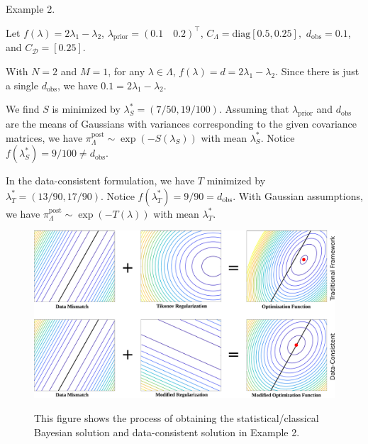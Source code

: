 \documentclass[11pt]{beamer}
\begin{document}
\begin{frame}

\begin{block}{Example 2. \footnotemark[1]}


\noindent  Let $f(\lambda)=2\lambda_1-\lambda_2$, $\lambda_\text{prior}=(0.1 \quad 0.2)^\top$, $C_\Lambda=\text{diag}[0.5,0.25],$ $d_\text{obs}=0.1$, and $C_\mathcal{D}=[0.25]$.

\vspace{0.25cm}

 With $N=2$ and $M=1$, for any $\lambda \in \Lambda$, $f(\lambda)=d=2\lambda_1-\lambda_2$. Since there is just a single $d_\text{obs}$, we have $0.1=2\lambda_1-\lambda_2$.

\vspace{.25cm}

We find $S$ is minimized by $\lambda^*_S=(7/50,19/100)$. 
Assuming that $\lambda_\text{prior}$ and $d_\text{obs}$ are the means of Gaussians with variances corresponding to the given covariance matrices, we have $\pi_\Lambda^\text{post} \sim \exp(-S(\lambda_S))$ with mean $\lambda_S^*$. Notice $f(\lambda^*_S)=9/100\neq d_\text{obs}$. 

\vspace{.25cm}
 
In the data-consistent formulation, we have 
$T$ minimized by $\lambda^*_T=(13/90,17/90)$. Notice $f(\lambda^*_T)=9/90=d_\text{obs}$. With Gaussian assumptions, we have $\pi_\Lambda^\text{post} \sim \exp(-T(\lambda))$ with mean $\lambda_T^*$. 

\end{block}


\end{frame}

\begin{frame}


\begin{figure} 
\includegraphics[scale=0.2]{Regularization-all-in-one.pdf}

This figure \footnotemark[1] shows the process of obtaining the statistical/classical Bayesian solution and data-consistent solution in Example 2.
\end{figure}


\end{frame}
\end{document}
